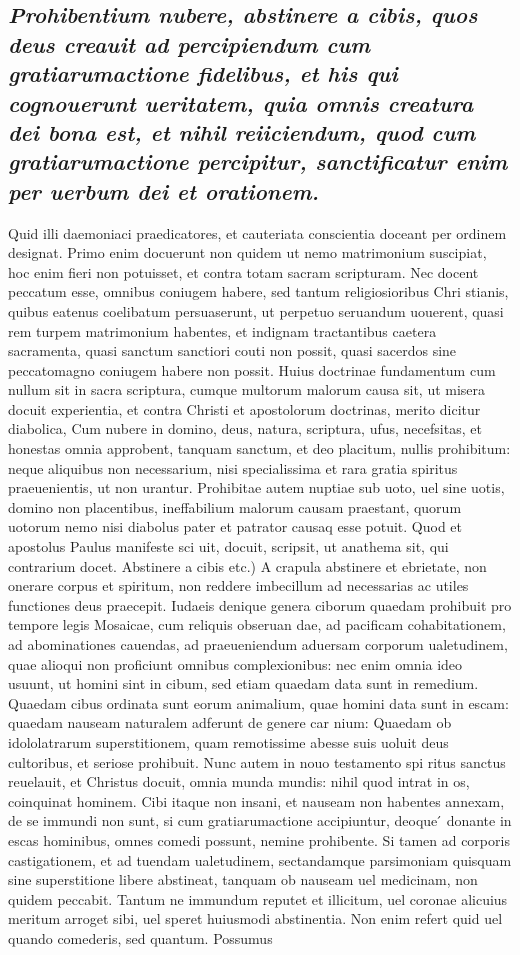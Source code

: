\documentclass{article}
\begin{document}
\begin{pages}
\subsection*{\textit{Prohibentium nubere, abstinere a cibis, quos deus creauit ad percipiendum cum gratiarumactione fidelibus, et his qui cognouerunt ueritatem, quia omnis creatura dei bona est, et nihil reiiciendum, quod cum gratiarumactione percipitur, sanctificatur enim per uerbum dei et orationem. }}\pstart Quid illi daemoniaci praedicatores, et cauteriata conscientia doceant per ordinem designat. Primo enim docuerunt non quidem ut nemo matrimonium suscipiat, hoc enim fieri non potuisset, et contra totam sacram scripturam. Nec docent peccatum esse, omnibus coniugem habere, sed tantum religiosioribus Chri stianis, quibus eatenus coelibatum persuaserunt, ut perpetuo seruandum uouerent, quasi rem turpem matrimonium habentes, et indignam tractantibus caetera sacramenta, quasi sanctum sanctiori couti non possit, quasi sacerdos sine peccatomagno coniugem habere non possit. Huius doctrinae fundamentum cum nullum sit in sacra scriptura, cumque multorum malorum causa sit, ut misera docuit experientia, et contra Christi et apostolorum doctrinas, merito dicitur diabolica, Cum nubere in domino, deus, natura, scriptura, ufus, necefsitas, et honestas omnia approbent, tanquam sanctum, et deo placitum, nullis prohibitum: neque aliquibus non necessarium, nisi specialissima et rara gratia spiritus praeuenientis, ut non urantur. Prohibitae autem nuptiae sub uoto, uel sine uotis, domino non placentibus, ineffabilium malorum causam praestant, quorum uotorum nemo nisi diabolus pater et patrator causaq esse potuit. Quod et apostolus Paulus manifeste sci uit, docuit, scripsit, ut anathema sit, qui contrarium docet. Abstinere a cibis etc.) A crapula abstinere et ebrietate, non onerare corpus et spiritum, non reddere imbecillum ad necessarias ac utiles functiones deus praecepit. Iudaeis denique genera ciborum quaedam prohibuit pro tempore legis Mosaicae, cum reliquis obseruan dae, ad pacificam cohabitationem, ad abominationes cauendas, ad praeueniendum aduersam corporum ualetudinem, quae alioqui non proficiunt omnibus complexionibus: nec enim omnia ideo usuunt, ut homini sint in cibum, sed etiam quaedam data sunt in remedium. Quaedam cibus ordinata sunt eorum animalium, quae homini data sunt in escam: quaedam nauseam naturalem adferunt de genere car nium: Quaedam ob idololatrarum superstitionem, quam remotissime abesse suis uoluit deus cultoribus, et seriose prohibuit. Nunc autem in nouo testamento spi ritus sanctus reuelauit, et Christus docuit, omnia munda mundis: nihil quod intrat in os, coinquinat hominem. Cibi itaque non insani, et nauseam non habentes annexam, de se immundi non sunt, si cum gratiarumactione accipiuntur, deoque ́ donante in escas hominibus, omnes comedi possunt, nemine prohibente. Si tamen ad corporis castigationem, et ad tuendam ualetudinem, sectandamque parsimoniam quisquam sine superstitione libere abstineat, tanquam ob nauseam uel medicinam, non quidem peccabit. Tantum ne immundum reputet et illicitum, uel coronae alicuius meritum arroget sibi, uel speret huiusmodi abstinentia. Non enim refert quid uel quando comederis, sed quantum. Possumus 
\end{pages}
\end{document}
